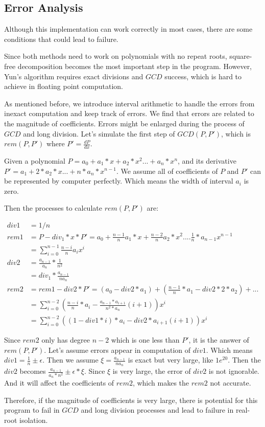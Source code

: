 \subsection{Error Analysis}

Although this implementation can work correctly in most cases, there are some
conditions that could lead to failure.

Since both methods need to work on polynomials with no repeat roots, square-free
decomposition becomes the most important step in the program. However, Yun's
algorithm requires exact divisions and $GCD$ success, which is hard to achieve
in floating point computation.

As mentioned before, we introduce interval arithmetic to handle the errors from
inexact computation and keep track of errors. We find that errors are related to
the magnitude of coefficients. Errors might be enlarged during the process of
$GCD$ and long division. Let's simulate the first step of $GCD(P,P')$, which is
$rem(P,P')$ where $P' = \frac{dP}{dx}$.

Given a polynomial $P=a_0+a_1*x + a_2*x^2...+a_n*x^n$, and its derivative
$P'=a_1+2*a_2*x...+n*a_n*x^{n-1}$. We assume all of coefficients of $P$ and $P'$
can be represented by computer perfectly. Which means the width of interval
$a_i$ is zero.

Then the processes to calculate $rem(P,P')$ are:

\begin{align*}
  div1 &= 1/n \\ 
  rem1 &= P - div_1 * x * P' =  a_0 + \frac{n-1}{n}a_1*x+ \frac{n-2}{n}a_2*x^2....
\frac{1}{n}*a_{n-1}x^{n-1}\\ 
       &= \sum_{i=0}^{n-1} \frac{n-i}{n} a_i x^i \\
  div2 &= \frac{a_{n-1}}{a_n} * \frac{1}{n^2} \\ 
       &= div_1 * \frac{a_{n-1}}{na_n}\\
  rem2 &= rem1 - div2 * P' = (a_0 - div2*a_1) + (\frac{n-1}{n}*a_1 - div2 *
  2*a_2)+ ... \\
      &= \sum_{i=0}^{n-2} (\frac{n-i}{n}*a_i -
      \frac{a_{n-1}*a_{i+1}}{n^2*a_n}(i+1)) x^i \\
      &= \sum_{i=0}^{n-2} ((1-div1*i)*a_i -
       div2 * a_{i+1}(i+1)) x^i
\end{align*} 

Since $rem2$ only has degree $n-2$ which is one less than $P'$, it is the answer
of $rem(P,P')$. Let's assume errors appear in computation of $div1$. Which means 
$div1 = \frac{1}{n}\pm \epsilon$. Then we assume $\xi = \frac{a_{n-1}}{na_n}$
is exact but very large, like $1e^{20}$. Then the $div2$ becomes
$\frac{a_{n-1}}{a_n*n^2} \pm \epsilon * \xi$. Since $\xi$ is very large, the
error of $div2$ is not ignorable. And it will affect the coefficients of $rem2$,
which makes the $rem2$ not accurate.

Therefore, if the magnitude of coefficients is very large, there is potential for
this program to fail in $GCD$ and long division processes and lead to failure in
real-root isolation.


